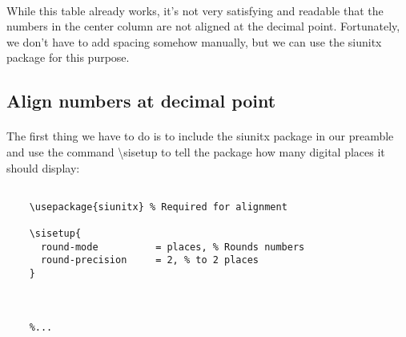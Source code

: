   \paragraph{}
  While this table already works, it's not very satisfying and readable that the numbers in the center column are not aligned at the decimal point. Fortunately, we don't have to add spacing somehow manually, but we can use the siunitx package for this purpose.
  
  \subsection{Align numbers at decimal point}
  \paragraph{}
    The first thing we have to do is to include the siunitx
    package in our preamble and use the command 
    \textbackslash sisetup to tell the package
    how many digital places it should display:

   
  \begin{lstlisting}[language={[LaTeX]TeX},breaklines=true,frame=single]
    %...

    \usepackage{siunitx} % Required for alignment
    
    \sisetup{
      round-mode          = places, % Rounds numbers
      round-precision     = 2, % to 2 places
    }
    
     
    
    %...
  \end{lstlisting}


